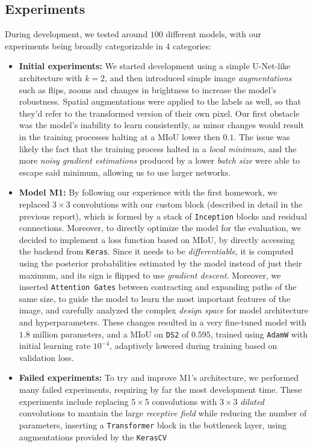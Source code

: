\documentclass[11pt]{article}
\begin{document}
\begin{multicols}{2}
      \section{Experiments}
      \label{sec:experiments}
      During development, we tested around $100$ different models, with our experiments being broadly categorizable in 4 categories:
      \begin{itemize}[leftmargin=*]
            \setlength\itemsep{0em}
            \item \textbf{Initial experiments:} We started development using a simple U-Net-like architecture with $k=2$, and then introduced simple image \textit{augmentations} such as flips, zooms and changes in brightness to increase the model's robustness. Spatial augmentations were applied to the labels as well, so that they'd refer to the transformed version of their own pixel. Our first obstacle was the model's inability to learn consistently, as minor changes would result in the training processes halting at a MIoU lower then $0.1$. The issue was likely the fact that the training process halted in a \textit{local minimum}, and the more \textit{noisy gradient estimations} produced by a lower \textit{batch size} were able to escape said minimum, allowing us to use larger networks.
            \item \textbf{Model M1:} By following our experience with the first homework, we replaced $3\times3$ convolutions with our custom block (described in detail in the previous report), which is formed by a stack of \texttt{Inception} blocks and residual connections. Moreover, to directly optimize the model for the evaluation, we decided to implement a loss function based on MIoU, by directly accessing the backend from \texttt{Keras}. Since it needs to be \textit{differentiable}, it is computed using the posterior probabilities estimated by the model instead of just their maximum, and its sign is flipped to use \textit{gradient descent}. Moreover, we inserted \texttt{Attention Gates}\cite{oktay2018attentionunetlearninglook} between contracting and expanding paths of the same size, to guide the model to learn the most important features of the image, and carefully analyzed the complex \textit{design space} for model architecture and hyperparameters. These changes resulted in a very fine-tuned model with $1.8$ million parameters, and a MIoU on \texttt{DS2} of $0.595$, trained using \texttt{AdamW} with initial learning rate $10^{-4}$, adaptively lowered during training based on validation loss.
            \item \textbf{Failed experiments:} To try and improve M1's architecture, we performed many failed experiments, requiring by far the most development time. These experiments include replacing $5\times5$ convolutions with $3\times3$ \textit{dilated} convolutions to mantain the large \textit{receptive field} while reducing the number of parameters, inserting a \texttt{Transformer}\cite{vaswani2023attentionneed} block in the bottleneck layer, using augmentations provided by the \texttt{KerasCV}%

\end{itemize}
\end{multicols}
\end{document}
